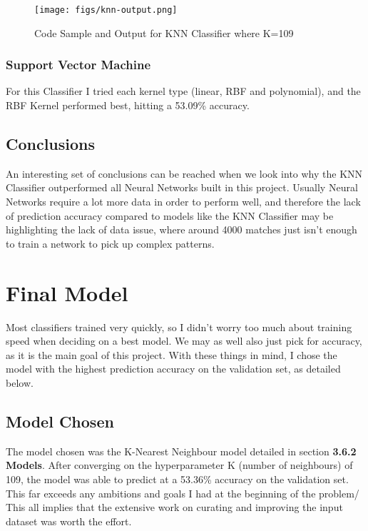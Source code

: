 \documentclass[12pt,a4paper,twoside,openright]{report}
\begin{document}
\begin{figure}[h]
  \centering
  \texttt{[image: figs/knn-output.png]}
  \caption{Code Sample and Output for KNN Classifier where K=109}
  \label{fig:knn-output}
\end{figure}

\subsubsection{Support Vector Machine}

For this Classifier I tried each kernel type (linear, RBF and polynomial), and the RBF Kernel performed best, hitting a 53.09\% accuracy.

\subsection{Conclusions}

An interesting set of conclusions can be reached when we look into why the KNN Classifier outperformed all Neural Networks built in this project. Usually Neural Networks require a lot more data in order to perform well, and therefore the lack of prediction accuracy compared to models like the KNN Classifier may be highlighting the lack of data issue, where around 4000 matches just isn't enough to train a network to pick up complex patterns.

\section{Final Model}

Most classifiers trained very quickly, so I didn't worry too much about training speed when deciding on a best model. We may as well also just pick for accuracy, as it is the main goal of this project. With these things in mind, I chose the model with the highest prediction accuracy on the validation set, as detailed below.

\subsection{Model Chosen}

The model chosen was the K-Nearest Neighbour model detailed in section \textbf{3.6.2 Models}. After converging on the hyperparameter K (number of neighbours) of 109, the model was able to predict at a 53.36\% accuracy on the validation set. This far exceeds any ambitions and goals I had at the beginning of the problem/ This all implies that the extensive work on curating and improving the input dataset was worth the effort.
\end{document}
